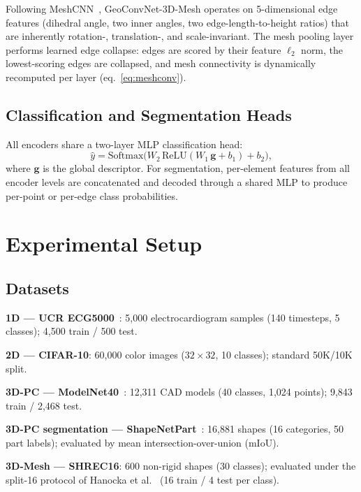\documentclass[10pt,conference]{IEEEtran}
\begin{document}
Following MeshCNN~\cite{hanocka2019meshcnn}, GeoConvNet-3D-Mesh operates
on 5-dimensional edge features (dihedral angle, two inner angles, two
edge-length-to-height ratios) that are inherently rotation-, translation-,
and scale-invariant. The mesh pooling layer performs learned edge collapse:
edges are scored by their feature $\ell_2$ norm, the lowest-scoring edges
are collapsed, and mesh connectivity is dynamically recomputed per layer
(eq.~\ref{eq:meshconv}).

\subsection{Classification and Segmentation Heads}

All encoders share a two-layer MLP classification head:
\begin{equation}
  \hat{y} = \mathrm{Softmax}\!\bigl(
    W_2\,\mathrm{ReLU}(W_1\,\mathbf{g}+b_1)+b_2
  \bigr),
\end{equation}
where $\mathbf{g}$ is the global descriptor. For segmentation,
per-element features from all encoder levels are concatenated and decoded
through a shared MLP to produce per-point or per-edge class probabilities.

\section{Experimental Setup}
\label{sec:experiments}

\subsection{Datasets}

\noindent\textbf{1D --- UCR ECG5000}~\cite{dau2019ucr}: 5{,}000
electrocardiogram samples (140 timesteps, 5 classes);
4{,}500 train / 500 test.

\noindent\textbf{2D --- CIFAR-10}: 60{,}000 color images
($32{\times}32$, 10 classes); standard 50K/10K split.

\noindent\textbf{3D-PC --- ModelNet40}~\cite{wu2015shapenets}: 12{,}311
CAD models (40 classes, 1{,}024 points); 9{,}843 train / 2{,}468 test.

\noindent\textbf{3D-PC segmentation --- ShapeNetPart}~\cite{chang2015shapenet}:
16{,}881 shapes (16 categories, 50 part labels); evaluated by mean
intersection-over-union (mIoU).

\noindent\textbf{3D-Mesh --- SHREC16}: 600 non-rigid shapes (30 classes);
evaluated under the split-16 protocol of Hanocka et
al.~\cite{hanocka2019meshcnn} (16 train / 4 test per class).
\end{document}

